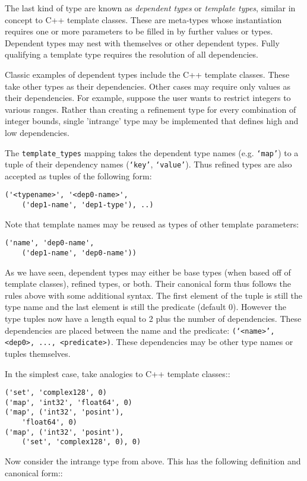 \documentclass{ansconfpaper}
\newcommand{\vin}[1]{\texttt{{#1}}}
\begin{document}
The last kind of type are known as \emph{dependent types} or \emph{template types}, 
similar in concept to C++ template classes.  These are meta-types whose 
instantiation requires one or more parameters to be filled in by further values or
types. Dependent types may nest with themselves or other dependent types.  Fully 
qualifying a template type requires the resolution of all dependencies.

Classic examples of dependent types include the C++ template classes.  These take
other types as their dependencies.  Other cases may require only values as 
their dependencies.  For example, suppose the user wants to restrict integers to 
various ranges.  Rather than creating a refinement type for every combination of 
integer bounds, single 'intrange' type may be implemented that defines high and low 
dependencies.

The \vin{template\_types} mapping takes the dependent type names (e.g. \vin{`map'})
to a tuple of their dependency names (\vin{`key'}, \vin{`value'}).   Thus 
refined types are also accepted as tuples of the following form:
\begin{lstlisting}
('<typename>', '<dep0-name>', 
    ('dep1-name', 'dep1-type'), ..)
\end{lstlisting}
Note that template names may be reused as types of other template parameters:
\begin{lstlisting}
('name', 'dep0-name', 
    ('dep1-name', 'dep0-name'))
\end{lstlisting}

As we have seen, dependent
types may either be base types (when based off of template classes), refined types,
or both.  Their canonical form thus follows the rules above with some additional 
syntax.  The first element of the tuple is still the type name and the last 
element is still the predicate (default 0).  However the type tuples now have a
length equal to 2 plus the number of dependencies.  These dependencies are 
placed between the name and the predicate: \vin{(`<name>', <dep0>, ..., <predicate>)}.
These dependencies may be other type names or tuples themselves. 

In the simplest case, take analogies to C++ template classes::
\begin{lstlisting}
('set', 'complex128', 0)
('map', 'int32', 'float64', 0)
('map', ('int32', 'posint'), 
    'float64', 0)
('map', ('int32', 'posint'), 
    ('set', 'complex128', 0), 0)
\end{lstlisting}
Now consider the intrange type from above.  This has the following definition and
canonical form::
\end{document}
